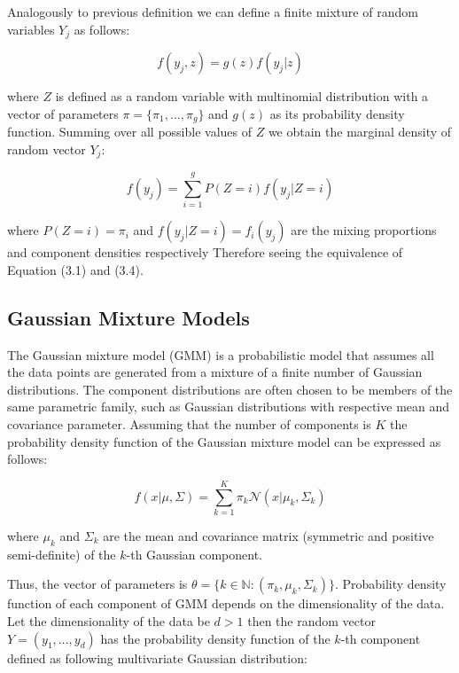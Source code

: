 Analogously to previous definition we can define a finite mixture of random variables $Y_j$ as follows:

\begin{equation}
    f(y_j,z) =  g(z) f(y_j|z)
\end{equation}

where $Z$ is defined as a random variable with multinomial distribution with a vector of parameters $\pi = \{\pi_1,\ldots,\pi_g\}$ and $g(z)$ as its probability density function.
Summing over all possible values of $Z$ we obtain the marginal density of random vector $Y_j$:

\begin{equation}
    f(y_j) = \sum_{i=1}^{g} P(Z=i) f(y_j|Z=i)
\end{equation}
    
where $P(Z=i) = \pi_i$ and $f(y_j|Z=i) = f_i(y_j)$ are the mixing proportions and component densities respectively Therefore
seeing the equivalence of Equation (3.1) and (3.4).

\subsection{Gaussian Mixture Models}
The Gaussian mixture model (GMM) is a probabilistic model that assumes all the data points are generated 
from a mixture of a finite number of Gaussian distributions. The component distributions are often chosen to be members of the same parametric family,
such as Gaussian distributions with respective mean and covariance parameter. Assuming that the number of components is $K$
the probability density function of the Gaussian mixture model can be expressed as follows:

\begin{equation}
    f(x|\mu,\Sigma) = \sum_{k=1}^{K} \pi_k \mathcal{N}(x|\mu_k, \Sigma_k)
\end{equation}

where $\mu_k$ and $\Sigma_k$ are the mean and covariance matrix (symmetric and positive semi-definite) of the $k$-th Gaussian component. 

Thus, the vector of parameters is $\theta = \{k \in \mathbb{N}: (\pi_k,\mu_k,\Sigma_k)\}$. Probability density function of each component of GMM depends on the dimensionality of the data.
Let the dimensionality of the data be $d>1$ then the random vector $Y=(y_1,\ldots,y_d)$ has the probability density function of the $k$-th component 
defined as following multivariate Gaussian distribution:


